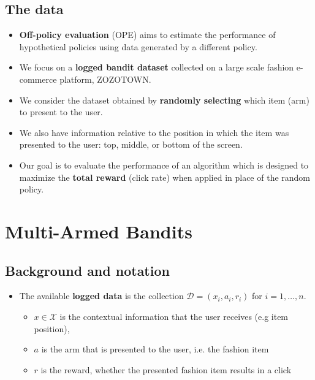 \documentclass[a0,portrait]{a0poster}
\begin{document}
\begin{multicols}{2}
\subsection*{The data}
\begin{itemize}
\item[] \textbf{Off-policy evaluation} (OPE) aims to estimate the performance of hypothetical policies using data generated by a different policy.
\item[] We focus on a \textbf{logged bandit dataset} collected on a large scale fashion e-commerce platform, ZOZOTOWN.
\item[] We consider the dataset obtained by \textbf{randomly selecting} which item (arm) to present to the user.
\item[] We also have information relative to the position in which the item was presented to the user: top, middle, or bottom of the screen.


\item[] Our goal is to evaluate the performance of an algorithm which is designed to maximize the \textbf{total  reward} (click rate) when applied in place of the random policy.


\end{itemize}



\color{DarkRed}
\section*{Multi-Armed Bandits}
\color{Black}
\subsection*{Background and notation}
\begin{itemize}
    \item[] The available \textbf{logged data} is the collection $\mathcal{D} = (x_i, a_i, r_i)$ for $i= 1, \dots,n$.
    
\begin{itemize}
    \item $x \in \mathcal{X}$ is the contextual information that the user receives (e.g item position),
    \item $a$ is the arm that is presented to the user, i.e. the fashion item
    \item $r$ is the reward, whether the presented fashion item results in a click
\end{itemize}
\end{itemize}


\end{multicols}
\end{document}
